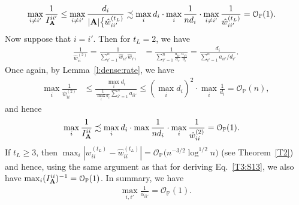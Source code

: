 \documentclass[10pt,journal,compsoc]{IEEEtran}
\newcommand{\op}{\mathcal{O}_{\mathbb{P}}}
\newcommand{\ee}{\end{aligned} \end{equation}}
\newcommand{\bee}{\begin{equation}\begin{aligned}}
\newcommand{\M}[1]{{{\mathbf{\MakeUppercase{#1}}}}}
\numberwithin{equation}{section}
\begin{document}
\bee\label{T3:S13}
\max_{i \neq {i'}}\frac{1}{I^{ii'}_{\M A}} &\leq \max_{i\neq
  i'}\frac{d_i}{|\M A| \big\{\hat{w}^{(t_L)}_{ii'}}
\precsim \max_i d_i \cdot \max_{i} \frac{1}{n d_i} \cdot \max_{i \neq {i'}}\frac{1}{\hat{w}^{(t_L)}_{ii'}}
= \op(1).
\ee
Now suppose that $i = i'$. Then for $t_L = 2$, we have
\bee\nonumber
\frac{1}{\hat{w}_{ii}^{(2)}} = \frac{1}{\sum_{i' =
    1}^{n}\hat{w}_{ii'}\hat{w}_{i'i}} &=
\frac{1}{\sum_{i' = 1}^n\frac{a_{ii'}}{d_{i'}}\frac{a_{i'i}}{d_i}} 
= \frac{d_i}{\sum_{i' = 1}^n a_{ii'}/d_{i'}}.
\ee
Once again, by Lemma~\ref{l:dense:rate}, we have
\bee\nonumber
\max_{i}\frac{1}{\hat{w}_{ii}^{(2)}} &\leq \frac{\max_i d_i}{\frac{1}{\max_i
    d_i}\sum_{i' = 1}^n a_{ii'}}
    \leq {(\max_i d_i)^2}  \cdot\max_i
    \frac{1}{d_i} = \op(n), 
\ee
and hence
\bee
\nonumber \max_{i}\frac{1}{I^{ii}_{\M A}}&\precsim \max_{i}d_i \cdot \max\frac{1}{nd_i}  \cdot \max_i\frac{1}{\hat{w}_{ii}^{(2)}} = \op(1).
\ee
If $t_L \geq 3$, then 
$\max_{i}|{w}_{ii}^{(t_L)} - \hat{w}_{ii}^{(t_L)}| =
\op\big(n^{-3/2}\log^{1/2}{n}\big)$
(see Theorem~\ref{T2}) and hence, using the same argument as that for deriving
Eq.~\eqref{T3:S13}, we also have $\max_{i}({I^{ii}_{\M A}})^{-1} =
\op(1)$. In summary, we have %
\bee\label{T3:S1f}
\max_{i,i'}\frac{1}{\alpha_{ii'}} = \op(1).
\ee
\end{document}
